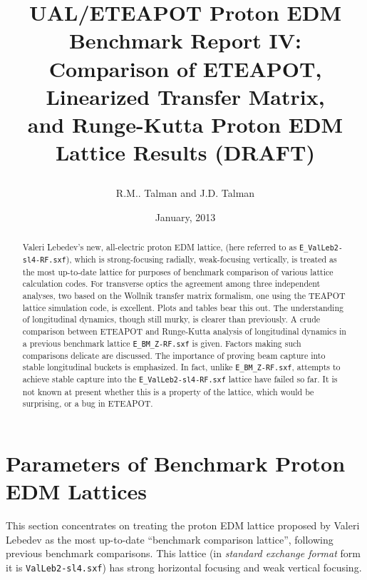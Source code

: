 \documentclass[12]{article}
\begin{document}
\date{January, 2013}

\title{
\centerline{}
\centerline{}
\centerline{}
UAL/ETEAPOT Proton EDM Benchmark Report IV: \\ 
Comparison of ETEAPOT, Linearized Transfer Matrix, \\
and Runge-Kutta Proton EDM Lattice Results (DRAFT)
}
\author{R.M.. Talman and J.D. Talman
}

\maketitle


\begin{abstract}
Valeri Lebedev's new, all-electric proton EDM lattice, 
(here referred to as {\tt E\_ValLeb2-sl4-RF.sxf}), which is
strong-focusing radially, weak-focusing vertically, is 
treated as the most up-to-date lattice for purposes of 
benchmark comparison of various lattice calculation codes. 
For transverse optics the agreement among three independent 
analyses, two based on the Wollnik transfer matrix formalism, 
one using the TEAPOT lattice simulation code, is excellent. 
Plots and tables bear this out.
The understanding of longitudinal dynamics, though still murky, 
is clearer than previously. A crude comparison between ETEAPOT 
and Runge-Kutta analysis of longitudinal dynamics in a
previous benchmark lattice {\tt E\_BM\_Z-RF.sxf} is given. 
Factors making such comparisons delicate are discussed. 
The importance of proving beam capture into stable longitudinal 
buckets is emphasized. In fact, unlike {\tt E\_BM\_Z-RF.sxf},
attempts to achieve stable capture into the 
{\tt E\_ValLeb2-sl4-RF.sxf} lattice have failed so far.
It is not known at present whether this is a property of the
lattice, which would be surprising, or a bug in ETEAPOT.
\end{abstract}
%

\clearpage

\section{Parameters of Benchmark Proton EDM Lattices}
This section concentrates on treating the proton EDM lattice
proposed by Valeri Lebedev\cite{ValLeb2} as the most up-to-date 
``benchmark comparison lattice'', following  previous benchmark 
comparisons\cite{Benchmark-I}\cite{Benchmark-II}\cite{Benchmark-III}\cite{YKS-tracking}.
This lattice (in \emph{standard exchange format} form it is {\tt ValLeb2-sl4.sxf})
has strong horizontal focusing and weak vertical focusing. 
\end{document}
